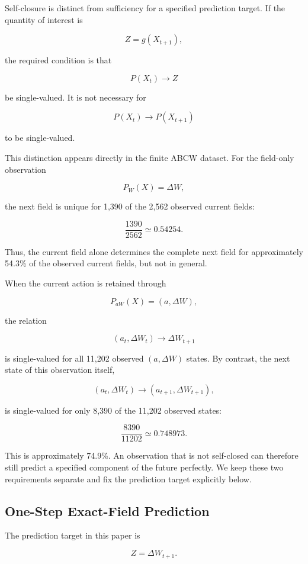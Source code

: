 \documentclass[
  11pt,
]{article}
\begin{document}
Self-closure is distinct from sufficiency for a specified prediction
target. If the quantity of interest is

\[{Z=g(X_{t+1}),}\]

the required condition is that

\[{P(X_t)\longrightarrow Z}\]

be single-valued. It is not necessary for

\[{P(X_t)\longrightarrow P(X_{t+1})}\]

to be single-valued.

This distinction appears directly in the finite ABCW dataset. For the
field-only observation

\[{P_W(X)=\Delta W,}\]

the next field is unique for 1,390 of the 2,562 observed current fields:

\[{\frac{1390}{2562}\simeq0.54254.}\]

Thus, the current field alone determines the complete next field for
approximately 54.3\% of the observed current fields, but not in general.

When the current action is retained through

\[{P_{aW}(X)=(a,\Delta W),}\]

the relation

\[{(a_t,\Delta W_t)\longrightarrow\Delta W_{t+1}}\]

is single-valued for all 11,202 observed \({(a,\Delta W)}\) states. By
contrast, the next state of this observation itself,

\[{(a_t,\Delta W_t)\longrightarrow(a_{t+1},\Delta W_{t+1}),}\]

is single-valued for only 8,390 of the 11,202 observed states:

\[{\frac{8390}{11202}\simeq0.748973.}\]

This is approximately 74.9\%. An observation that is not self-closed can
therefore still predict a specified component of the future perfectly.
We keep these two requirements separate and fix the prediction target
explicitly below.

\hypertarget{one-step-exact-field-prediction}{%
\subsection{One-Step Exact-Field
Prediction}\label{one-step-exact-field-prediction}}

The prediction target in this paper is

\[{Z=\Delta W_{t+1}.}\]
\end{document}
